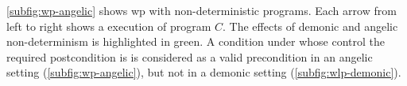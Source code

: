 
\autoref{subfig:wp-angelic} shows wp with non-deterministic programs. 
Each arrow from left to right shows a  execution of program $C$. 
The effects of demonic and angelic non-determinism is highlighted in green. 
A condition under whose control the required postcondition is  is considered as a valid precondition in an angelic setting (\autoref{subfig:wp-angelic}), but not in a demonic setting (\autoref{subfig:wlp-demonic}). 


